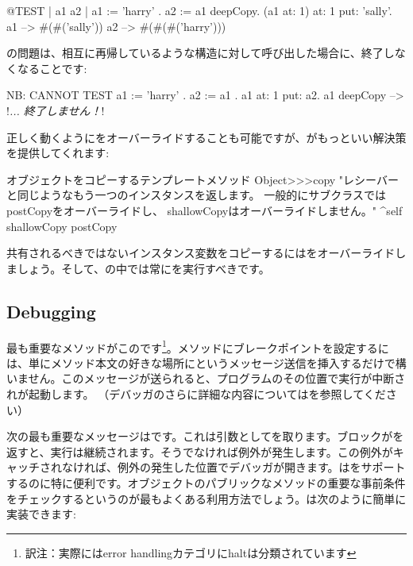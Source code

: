 \documentclass[a4paper,10pt,twoside]{book}
\begin{document}
\begin{code}{@TEST | a1 a2 |}
a1 := { { { 'harry' } } } .
a2 := a1 deepCopy.
(a1 at: 1) at: 1 put: 'sally'.
a1 --> #(#('sally'))
a2 --> #(#(#('harry')))
\end{code}

の問題は、相互に再帰しているような構造に対して呼び出した場合に、終了しなくなることです:

\begin{code}{NB: CANNOT TEST}
a1 := { 'harry' }.
a2 := { a1 }.
a1 at: 1 put: a2.
a1 deepCopy --> !\emph{... 終了しません！}!
\end{code}

正しく動くようにをオーバーライドすることも可能ですが、がもっといい解決策を提供してくれます:

\begin{method}{オブジェクトをコピーするテンプレートメソッド}
Object>>>copy
    "レシーバーと同じようなもう一つのインスタンスを返します。
    一般的にサブクラスではpostCopyをオーバーライドし、
    shallowCopyはオーバーライドしません。"
    ^self shallowCopy postCopy
\end{method}

共有されるべきではないインスタンス変数をコピーするにはをオーバーライドしましょう。そして、の中では常にを実行すべきです。


\subsection{Debugging}

最も重要なメソッドがこのです\footnote{訳注：実際にはerror handlingカテゴリにhaltは分類されています}。メソッドにブレークポイントを設定するには、単にメソッド本文の好きな場所にというメッセージ送信を挿入するだけで構いません。このメッセージが送られると、プログラムのその位置で実行が中断されが起動します。
（デバッガのさらに詳細な内容についてはを参照してください）


次の最も重要なメッセージはです。これは引数としてを取ります。ブロックがを返すと、実行は継続されます。そうでなければ例外が発生します。この例外がキャッチされなければ、例外の発生した位置でデバッガが開きます。はをサポートするのに特に便利です。オブジェクトのパブリックなメソッドの重要な事前条件をチェックするというのが最もよくある利用方法でしょう。は次のように簡単に実装できます:
\end{document}
